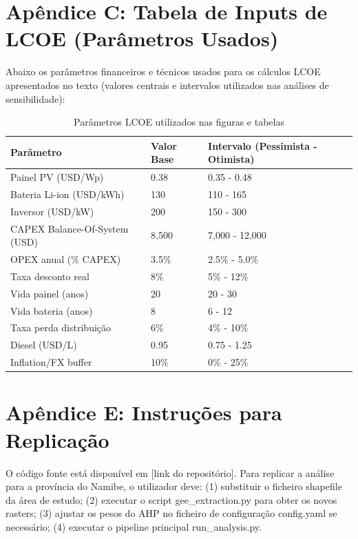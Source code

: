 \documentclass[12pt, a4paper]{article}
\begin{document}
{{{{{{{{{{{{\section*{Apêndice C: Tabela de Inputs de LCOE (Parâmetros Usados)}

Abaixo os parâmetros financeiros e técnicos usados para os cálculos LCOE apresentados no texto (valores centrais e intervalos utilizados nas análises de sensibilidade):

\begin{table}[H]
\centering
\small
\begin{tabular}{|l|l|l|}
\hline
Parâmetro & Valor Base & Intervalo (Pessimista - Otimista) \\
\hline
Painel PV (USD/Wp) & 0.38 & 0.35 - 0.48 \\
Bateria Li-ion (USD/kWh) & 130 & 110 - 165 \\
Inversor (USD/kW) & 200 & 150 - 300 \\
CAPEX Balance-Of-System (USD) & 8,500 & 7,000 - 12,000 \\
OPEX anual (\% CAPEX) & 3.5\% & 2.5\% - 5.0\% \\
Taxa desconto real & 8\% & 5\% - 12\% \\
Vida painel (anos) & 20 & 20 - 30 \\
Vida bateria (anos) & 8 & 6 - 12 \\
Taxa perda distribuição & 6\% & 4\% - 10\% \\
Diesel (USD/L) & 0.95 & 0.75 - 1.25 \\
Inflation/FX buffer & 10\% & 0\% - 25\% \\
\hline
\end{tabular}
\caption{Parâmetros LCOE utilizados nas figuras e tabelas}
\end{table}

\section*{Apêndice E: Instruções para Replicação}

O código fonte está disponível em [link do repositório]. Para replicar a análise para a província do Namibe, o utilizador deve: (1) substituir o ficheiro shapefile da área de estudo; (2) executar o script gee\_extraction.py para obter os novos rasters; (3) ajustar os pesos do AHP no ficheiro de configuração config.yaml se necessário; (4) executar o pipeline principal run\_analysis.py.

}}}}}}}}}}}}
\end{document}
